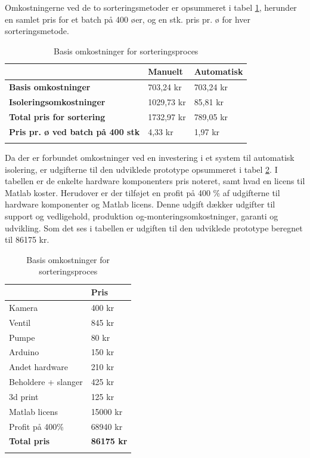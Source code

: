 Omkostningerne ved de to sorteringsmetoder er opsummeret i tabel \ref{tab:totalcost}, herunder en samlet pris for et batch på 400 øer, og en stk. pris pr. ø for hver sorteringsmetode.
\begin{center}
		\begin{longtable}{ | m{8cm} | m{2.25cm} | m{2.25cm} | } 
			\hline
			 &\textbf{Manuelt} & \textbf{Automatisk} \\ 
			\hline
			 \textbf{Basis omkostninger} & 703,24 kr & 703,24 kr \\ 
			\hline
			 \textbf{Isoleringsomkostninger} & 1029,73 kr & 85,81 kr \\ 
			\hline
			\textbf{Total pris for sortering} & 1732,97 kr & 789,05 kr \\ 
			\hline
			\textbf{Pris pr. ø ved batch på 400 stk} & 4,33 kr & 1,97 kr \\ 
			\hline
			\caption{Basis omkostninger for sorteringsproces}
			\label{tab:totalcost}
			 		\end{longtable}
\end{center}

Da der er forbundet omkostninger ved en investering i et system til automatisk isolering, er udgifterne til den udviklede prototype opsummeret i tabel \ref{tab:prototypecost}. I tabellen er de enkelte hardware komponenters pris noteret, samt hvad en licens til Matlab koster. Herudover er der tilføjet en profit på 400 \% af udgifterne til hardware komponenter og Matlab licens. Denne udgift dækker udgifter til support og vedligehold, produktion og-monteringsomkostninger, garanti og udvikling. Som det ses i tabellen er udgiften til den udviklede prototype beregnet til 86175 kr.
\begin{center}
		\begin{longtable}{ | m{9.5cm} | m{3.5cm} | } 
			\hline
			  & \textbf{Pris} \\ 
			\hline
			Kamera & 400 kr \\ 
			\hline
			 Ventil & 845 kr\\ 
			\hline
			Pumpe & 80 kr  \\ 
			\hline
			Arduino & 150 kr \\ 
			\hline
			Andet hardware & 210 kr \\ 
			\hline
			Beholdere + slanger & 425 kr \\ 
			\hline
			3d print & 125 kr \\ 
			\hline
			Matlab licens & 15000 kr \\
			\hline
			Profit på 400\% & 68940 kr \\	
			\hline
			\textbf{Total pris} & \textbf{86175 kr} \\		
			
			\hline
			\caption{Basis omkostninger for sorteringsproces}
			\label{tab:prototypecost}
			 		\end{longtable}
\end{center}


